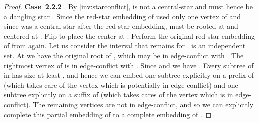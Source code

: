 \documentclass[11pt,a4paper,colorlinks=true,urlcolor=blue,citecolor=red]{article}
\theoremstyle{plain}
\newcommand{\case}[1]{\par\vspace{.5\baselineskip}\noindent\textbf{\sffamily Case~#1}}
\begin{document}
\begin{proof}
  \case{2.2.2} . By
  \ref{inv:starconflict},  is not a central-star and must
  hence be a dangling star . Since the red-star
  embedding of  used only one vertex of  and since
   was a central-star after the red-star embedding,
   must be rooted at  and centered at . Flip
   to place the center at . Perform the original
  red-star embedding of  from  again. Let us consider the
  interval  that remains for .  is an
  independent set. At  we have the original root of ,
  which may be in edge-conflict with . The rightmost vertex of
   is in edge-conflict with . Since
   and  we have
  . Every subtree of  in
   has size at least , and hence we can embed one subtree
  explicitly on a prefix of  (which takes care of the vertex
   which is potentially in edge-conflict) and one subtree explicitly
  on a suffix of  (which takes cares of the vertex 
  which is in edge-conflict). The remaining vertices are not
  in edge-conflict, and so we can explicitly complete this partial
  embedding of  to a complete embedding of .
\end{proof}
\end{document}
